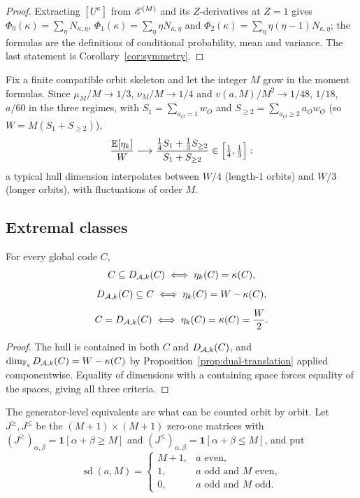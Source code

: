 \begin{proof}
Extracting $[U^\kappa]$ from $\mathscr E^{(M)}$ and its $Z$-derivatives at $Z=1$
gives $\Phi_0(\kappa)=\sum_\eta N_{\kappa,\eta}$,
$\Phi_1(\kappa)=\sum_\eta\eta N_{\kappa,\eta}$ and
$\Phi_2(\kappa)=\sum_\eta\eta(\eta-1)N_{\kappa,\eta}$; the formulas are the
definitions of conditional probability, mean and variance.  The last statement
is Corollary~\ref{cor:symmetry}.
\end{proof}

\begin{remark}\label{rem:asymptotic-moments}
Fix a finite compatible orbit skeleton and let the integer $M$ grow in the
moment formulas.  Since
$\mu_M/M\to1/3$, $\nu_M/M\to1/4$ and $v(a,M)/M^2\to1/48$, $1/18$, $a/60$ in the
three regimes, with $S_1=\sum_{a_O=1}w_O$ and
$S_{\geq2}=\sum_{a_O\geq2}a_Ow_O$ (so $W=M(S_1+S_{\geq2})$),
{\small
\[
\frac{\mathbb{E}[\eta_k]}{W}\longrightarrow
 \frac{\tfrac14S_1+\tfrac13S_{\geq2}}{S_1+S_{\geq2}}\in\Bigl[\tfrac14,\tfrac13\Bigr]:
\]
}
a typical hull dimension interpolates between $W/4$ (length-$1$ orbits) and
$W/3$ (longer orbits), with fluctuations of order $M$.
\end{remark}

\subsection{Extremal classes}\label{sec:extremal}

\begin{proposition}\label{prop:dimension-criteria}
For every global code $C$,
\[
\begin{gathered}
C\subseteq D_{\mathcal A,k}(C)
\iff \eta_k(C)=\kappa(C),\\[5pt]
D_{\mathcal A,k}(C)\subseteq C
\iff \eta_k(C)=W-\kappa(C),\\[5pt]
C=D_{\mathcal A,k}(C)
\iff \eta_k(C)=\kappa(C)=\frac{W}{2}.
\end{gathered}
\]
\end{proposition}

\begin{proof}
The hull is contained in both $C$ and $D_{\mathcal A,k}(C)$, and
$\dim_{\mathbb F_q}D_{\mathcal A,k}(C)=W-\kappa(C)$ by
Proposition~\ref{prop:dual-translation} applied componentwise.  Equality of
dimensions with a containing space forces equality of the spaces, giving all
three criteria.
\end{proof}

The generator-level equivalents are what can be counted orbit by orbit.  Let
$J^{\geq},J^{\leq}$ be the $(M+1)\times(M+1)$ zero-one matrices with
$(J^{\geq})_{\alpha,\beta}=\mathbf{1}[\alpha+\beta\geq M]$ and
$(J^{\leq})_{\alpha,\beta}=\mathbf{1}[\alpha+\beta\leq M]$, and put
{\small
\[
\operatorname{sd}(a,M)=
\begin{cases}
M+1,&a\text{ even},\\
1,&a\text{ odd and }M\text{ even},\\
0,&a\text{ odd and }M\text{ odd}.
\end{cases}
\]
}


